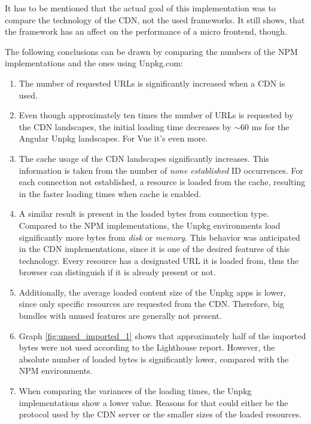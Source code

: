 It has to be mentioned that the actual goal of this implementation was to compare the technology of the CDN, not the used frameworks. It still shows, that the framework has an affect on the performance of a micro frontend, though.

The following conclusions can be drawn by comparing the numbers of the NPM implementations and the ones using Unpkg.com:

\begin{enumerate}
	\item The number of requested URLs is significantly increased when a CDN is used.
	
	\item Even though approximately ten times the number of URLs is requested by the CDN landscapes, the initial loading time decreases by $\sim$60 ms for the Angular Unpkg landscapes. For Vue it's even more.
	
	\item The cache usage of the CDN landscapes significantly increases. This information is taken from the number of \textit{none established} ID occurrences. For each connection not established, a resource is loaded from the cache, resulting in the faster loading times when cache is enabled.
	
	\item A similar result is present in the loaded bytes from connection type. Compared to the NPM implementations, the Unpkg environments load significantly more bytes from \textit{disk} or \textit{memory}. This behavior was anticipated in the CDN implementations, since it is one of the desired features of this technology. Every resource has a designated URL it is loaded from, thus the browser can distinguish if it is already present or not.
	
	\item Additionally, the average loaded content size of the Unpkg apps is lower, since only specific resources are requested from the CDN. Therefore, big bundles with unused features are generally not present.
	
	\item Graph \ref{fig:unsed_imported_1} shows that approximately half of the imported bytes were not used according to the Lighthouse report. However, the absolute number of loaded bytes is significantly lower, compared with the NPM environments.
	
	\item When comparing the variances of the loading times, the Unpkg implementations show a lower value. Reasons for that could either be the protocol used by the CDN server or the smaller sizes of the loaded resources.
\end{enumerate}

